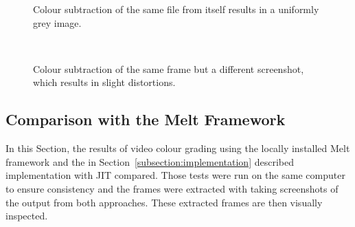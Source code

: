 \documentclass[../MasterThesis.tex]{subfiles}
\begin{document}
\begin{minipage}{0.48\textwidth}
	
	\begin{figure}[H]
		\begin{center}
			\caption[Colour subtraction of the same file from itself.]{Colour subtraction of the same file from itself results in a uniformly grey image.}
			\label{figure:greyresult_unit}
		\end{center}
	\end{figure}
\end{minipage}\begin{minipage}{0.04\textwidth}
	\ 
\end{minipage}\begin{minipage}{0.48\textwidth}	
	\begin{figure}[H]
		\begin{center}
			\caption[Colour subtraction of the same frame but a different screenshot.]{Colour subtraction of the same frame but a different screenshot, which results in slight distortions.}
			\label{figure:greyresult_blurry}
		\end{center}
	\end{figure}
\end{minipage}











\subsection{Comparison with the Melt Framework} \label{section:comparisonMelt}


In this Section, the results of video colour grading using the locally installed Melt framework and the in Section~\ref{subsection:implementation} described implementation with JIT compared. 
Those tests were run on the same computer to ensure consistency and the frames were extracted with taking screenshots of the output from both approaches. These extracted frames are then visually inspected. 


\end{document}
